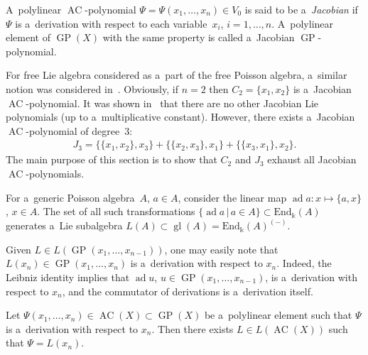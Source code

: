 \documentclass[pdftex]{sigma}
\DeclareMathOperator{\ad}{ad}
\begin{document}
\begin{definition}
A~polylinear $\operatorname{AC}$-polynomial $\Psi=\Psi(x_1,\dots, x_n)\in V_0$ is said to be a~{\em Jacobian} if~$\Psi $ is a~derivation
with respect to each variable~$x_i$, $i=1,\dots, n$.
A~polylinear element of $\operatorname{GP}(X)$ with the same property is called a~Jacobian $\operatorname{GP}$-polynomial.
\end{definition}

For free Lie algebra considered as a~part of the free Poisson algebra, a~similar notion was considered
in~\cite{FarkasI}.
Obviously, if $n=2$ then $C_2=\{x_1,x_2\}$ is a~Jacobian $\operatorname{AC}$-polynomial.
It was shown in~\cite{FarkasI} that there are no other Jacobian Lie polynomials (up to a~multiplicative constant).
However, there exists a~Jacobian $\operatorname{AC}$-polynomial of degree~3:
\begin{gather*}
J_3 =\{\{x_1,x_2\},x_3\} + \{\{x_2,x_3\},x_1\} + \{\{x_3,x_1\},x_2\}.
\end{gather*}
The main purpose of this section is to show that $C_2$ and $J_3$ exhaust all Jacobian $\operatorname{AC}$-polynomials.

For a~generic Poisson algebra~$A$, $a\in A$, consider the linear map $\ad a: x\mapsto \{a,x\}$, $x\in A$.
The set of all such transformations $\{\ad a\,|\, a\in A\}\subset \mathrm{End}_{\Bbbk}(A)$ generates a~Lie
subalgebra $L(A)\subset \operatorname{gl} (A) = \mathrm{End}_{\Bbbk}(A)^{(-)}$.

Given $L\in L(\operatorname{GP}(x_1,\dots, x_{n-1}))$, one may easily note that $L(x_n)\in \operatorname{GP}(x_1,\dots, x_{n})$ is a~derivation with
respect to $x_n$.
Indeed, the Leibniz identity implies that $\ad u$, $u\in \operatorname{GP}(x_1,\dots, x_{n-1})$, is a~derivation with respect
to $x_n$, and the commutator of derivations is a~derivation itself.

\begin{lemma}
\label{lem:1Der_one_var}
Let $\Psi(x_1,\dots, x_n) \in \operatorname{AC}(X)\subset \operatorname{GP}(X)$ be a~polylinear element such that $\Psi $ is a~derivation with respect
to $x_n$.
Then there exists $L\in L(\operatorname{AC}(X))$ such that $\Psi = L(x_n)$.
\end{lemma}
\end{document}
